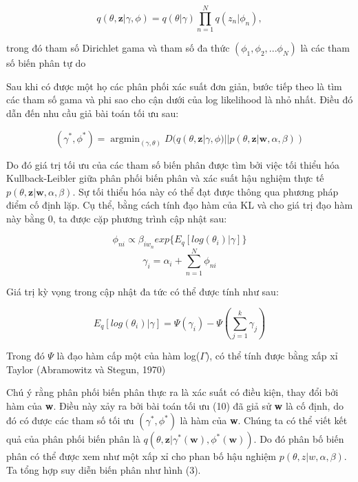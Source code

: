 \documentclass[12pt,a4paper]{article}
\DeclareMathOperator*{\argmin}{argmin}
\begin{document}
\begin{equation} 
q(\theta , \textbf{z} | \gamma, \phi ) = q(\theta | \gamma) \prod_{n=1}^{N} q(z_n | \phi_n),
\end{equation}

\noindent
trong đó tham số Dirichlet gama và tham số đa thức $(\phi_1, \phi_2, ...\phi_N)$ là các tham số biến phân tự do


Sau khi có được một họ các phân phối xác suất đơn giản, bước tiếp theo là tìm các tham số gama và phi sao cho cận dưới của log likelihood là nhỏ nhất. Điều đó dẫn đến nhu cầu giả bài toán tối ưu sau:


\begin{equation} 
(\gamma^{*}, \phi^{*}) = \argmin_{(\gamma, \theta)} D(q(\theta, \textbf{z} | \gamma, \phi) || p(\theta, \textbf{z} | \textbf{w}, \alpha, \beta))
\end{equation}

\noindent
Do đó giá trị tối ưu của các tham số biến phân được tìm bởi việc tối thiểu hóa Kullback-Leibler giữa phân phối biến phân và xác suất hậu nghiệm thực tế $p(\theta, \textbf{z}| \textbf{w}, \alpha, \beta)$. Sự tối thiểu hóa này có thể đạt được thông qua phương pháp điểm cố định lặp. Cụ thể, bằng cách tính đạo hàm của KL và cho giá trị đạo hàm này bằng 0, ta được cặp phương trình cập nhật sau:


\begin{equation} 
\phi_{ni} \propto \beta_{iw_n} exp \{ E_q [ log(\theta_i)| \gamma ] \} 
\end{equation}
\begin{equation} 
\gamma_i = \alpha_i + \sum_{n=1}^{N} \phi_{ni}
\end{equation}


\noindent
Giá trị kỳ vọng trong cập nhật đa tức có thể được tính như sau:

\begin{equation} 
E_q [ log(\theta_i) | \gamma ] = \Psi (\gamma_i) - \Psi \left(\sum_{j=1}^{k} \gamma_j \right)
\end{equation}

\noindent
Trong đó $\Psi$ là đạo hàm cấp một của hàm log($\Gamma$), có thể tính được bằng xấp xỉ Taylor (Abramowitz và Stegun, 1970)


Chú ý rằng phân phối biến phân thực ra là xác suất có điều kiện, thay đổi bởi hàm của \textbf{w}. Điều này xảy ra bởi bài toán tối ưu (10) đã giả sử \textbf{w} là cố định, do đó có được các tham số tối ưu $(\gamma^{*}, \phi^{*})$ là hàm của \textbf{w}. Chúng ta có thể viết kết quả của phân phối biến phân là $q(\theta, \textbf{z} | \gamma^{*} (\textbf{w}), \phi^{*} (\textbf{w}))$. Do đó phân bố biến phân có thể được xem như một xấp xỉ cho phan bố hậu nghiệm $p(\theta, z| w, \alpha, \beta)$. Ta tổng hợp suy diễn biến phân như hình (3).
\end{document}
